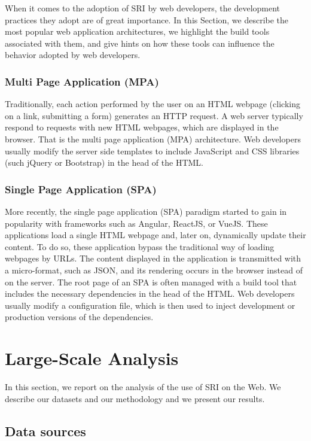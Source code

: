\documentclass[sigconf,table]{acmart}
\begin{document}
When it comes to the adoption of SRI by web developers, the development practices they adopt are of great importance.
In this Section, we describe the most popular web application architectures, we highlight the build tools associated with them, and give hints on how these tools can influence the behavior adopted by web developers.

\subsubsection{Multi Page Application (MPA)}

Traditionally, each action performed by the user on an HTML webpage (clicking on a link, submitting a form) generates an HTTP request.
A web server typically respond to requests with new HTML webpages, which are displayed in the browser.
That is the multi page application (MPA) architecture.
Web developers usually modify the server side templates to include JavaScript and CSS libraries (such jQuery or Bootstrap) in the head of the HTML.

\subsubsection{Single Page Application (SPA)}

More recently, the single page application (SPA) paradigm started to gain in popularity with frameworks such as Angular, ReactJS, or VueJS.
These applications load a single HTML webpage and, later on, dynamically update their content.
To do so, these application bypass the traditional way of loading webpages by URLs.
The content displayed in the application is transmitted with a micro-format, such as JSON, and its rendering occurs in the browser instead of on the server.
The root page of an SPA is often managed with a build tool that includes the necessary dependencies in the head of the HTML.
Web developers usually modify a configuration file, which is then used to inject development or production versions of the dependencies.


\section{Large-Scale Analysis} \label{sec:analysis}

In this section, we report on the analysis of the use of SRI on the Web. We describe our datasets and our methodology and we present our results.

\subsection{Data sources}
\end{document}

